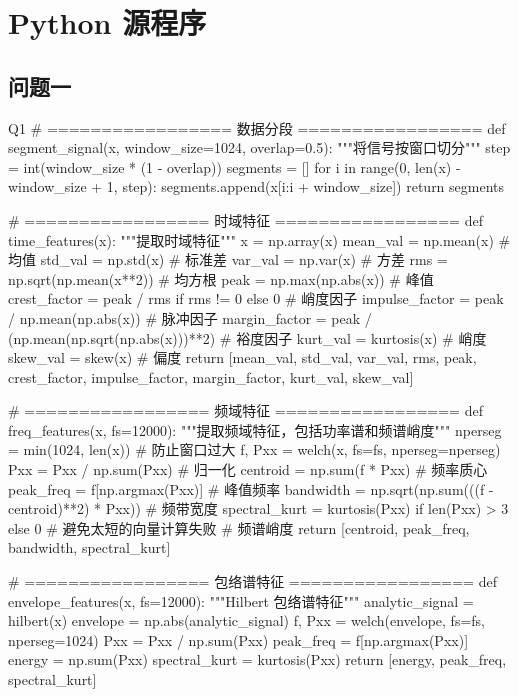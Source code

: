 \section{Python 源程序}
\renewcommand{\thesubsection}{A\thinskip.\thinskip\arabic{subsection}}
\subsection{问题一}
\vspace{-2ex}

\begin{Python}{Q1}
# ================= 数据分段 =================
def segment_signal(x, window_size=1024, overlap=0.5):
    """将信号按窗口切分"""
    step = int(window_size * (1 - overlap))
    segments = []
    for i in range(0, len(x) - window_size + 1, step):
        segments.append(x[i:i + window_size])
    return segments

# ================= 时域特征 =================
def time_features(x):
    """提取时域特征"""
    x = np.array(x)
    mean_val = np.mean(x)                         # 均值
    std_val = np.std(x)                           # 标准差
    var_val = np.var(x)                           # 方差
    rms = np.sqrt(np.mean(x**2))                  # 均方根
    peak = np.max(np.abs(x))                      # 峰值
    crest_factor = peak / rms if rms != 0 else 0  # 峭度因子
    impulse_factor = peak / np.mean(np.abs(x))    # 脉冲因子
    margin_factor = peak / (np.mean(np.sqrt(np.abs(x)))**2)  # 裕度因子
    kurt_val = kurtosis(x)                        # 峭度
    skew_val = skew(x)                            # 偏度
    return [mean_val, std_val, var_val, rms, peak, crest_factor,
            impulse_factor, margin_factor, kurt_val, skew_val]

# ================= 频域特征 =================
def freq_features(x, fs=12000):
    """提取频域特征，包括功率谱和频谱峭度"""
    nperseg = min(1024, len(x))  # 防止窗口过大
    f, Pxx = welch(x, fs=fs, nperseg=nperseg)
    Pxx = Pxx / np.sum(Pxx)  # 归一化
    centroid = np.sum(f * Pxx)                             # 频率质心
    peak_freq = f[np.argmax(Pxx)]                          # 峰值频率
    bandwidth = np.sqrt(np.sum(((f - centroid)**2) * Pxx)) # 频带宽度
    spectral_kurt = kurtosis(Pxx) if len(Pxx) > 3 else 0  # 避免太短的向量计算失败  # 频谱峭度
    return [centroid, peak_freq, bandwidth, spectral_kurt]

# ================= 包络谱特征 =================
def envelope_features(x, fs=12000):
    """Hilbert 包络谱特征"""
    analytic_signal = hilbert(x)
    envelope = np.abs(analytic_signal)
    f, Pxx = welch(envelope, fs=fs, nperseg=1024)
    Pxx = Pxx / np.sum(Pxx)
    peak_freq = f[np.argmax(Pxx)]
    energy = np.sum(Pxx)
    spectral_kurt = kurtosis(Pxx)
    return [energy, peak_freq, spectral_kurt]


\end{Python}
